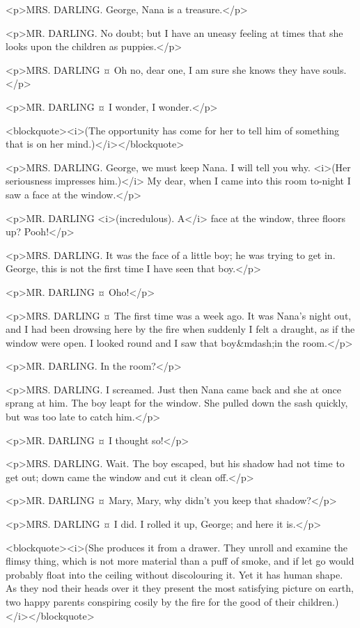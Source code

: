 <p>MRS. DARLING. George, Nana is a treasure.</p>

<p>MR. DARLING. No doubt; but I have an uneasy feeling at times that she looks upon the children as puppies.</p>

<p>MRS. DARLING ¤
Oh no, dear one, I am sure she knows they have souls.</p>

<p>MR. DARLING ¤
I wonder, I wonder.</p>

<blockquote><i>(The opportunity has come for her to tell him of something that is on her mind.)</i></blockquote>

<p>MRS. DARLING. George, we must keep Nana. I will tell you why. <i>(Her seriousness impresses him.)</i> My dear, when I came into this room to-night I saw a face at the window.</p>

<p>MR. DARLING <i>(incredulous). A</i> face at the window, three floors up? Pooh!</p>

<p>MRS. DARLING. It was the face of a little boy; he was trying to get in. George, this is not the first time I have seen that boy.</p>

<p>MR. DARLING ¤
Oho!</p>

<p>MRS. DARLING ¤
The first time was a week ago. It was Nana's night out, and I had been drowsing here by the fire when suddenly I felt a draught, as if the window were open. I looked round and I saw that boy&mdash;in the room.</p>

<p>MR. DARLING. In the room?</p>

<p>MRS. DARLING. I screamed. Just then Nana came back and she at once sprang at him. The boy leapt for the window. She pulled down the sash quickly, but was too late to catch him.</p>

<p>MR. DARLING ¤
I thought so!</p>

<p>MRS. DARLING. Wait. The boy escaped, but his shadow had not time to get out; down came the window and cut it clean off.</p>

<p>MR. DARLING ¤
Mary, Mary, why didn't you keep that shadow?</p>

<p>MRS. DARLING ¤
I did. I rolled it up, George; and here it is.</p>

<blockquote><i>(She produces it from a drawer. They unroll and examine the flimsy thing, which is not more material than a puff of smoke, and if let go would probably float into the ceiling without discolouring it. Yet it has human shape. As they nod their heads over it they present the most satisfying picture on earth, two happy parents conspiring cosily by the fire for the good of their children.)</i></blockquote>

